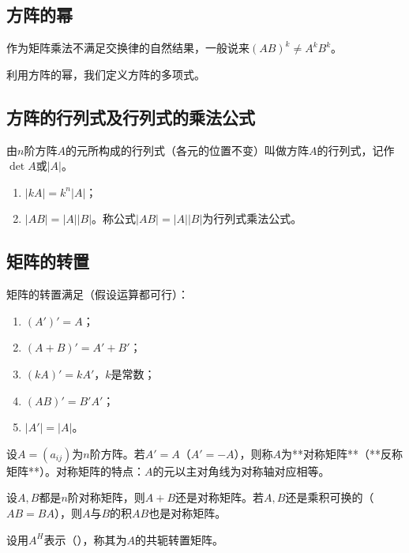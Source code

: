 \subsection{方阵的幂}
作为矩阵乘法不满足交换律的自然结果，一般说来$(AB)^k\neq A^kB^k$。

利用方阵的幂，我们定义方阵的多项式。

\subsection{方阵的行列式及行列式的乘法公式}
\begin{definition}
由$n$阶方阵$A$的元所构成的行列式（各元的位置不变）叫做方阵$A$的行列式，记作$\det A$或$|A|$。
\end{definition}

\begin{theorem}
\begin{enumerate}
    \item $|kA|=k^n|A|$；
    \item $|AB| =|A| |B|$。称公式$|AB| =|A| |B|$为行列式乘法公式。
\end{enumerate}
\end{theorem}

\subsection{矩阵的转置}
\begin{definition}
\end{definition}

矩阵的转置满足（假设运算都可行）：
\begin{enumerate}
    \item $(A')'=A$；
    \item $(A+B)'=A'+B'$；
    \item $(kA)'=kA'$，$k$是常数；
    \item $(AB)'=B'A'$；
    \item $|A'|=|A|$。
\end{enumerate}

设$A=(a_{ij})$为$n$阶方阵。若$A'=A$（$A'=-A$），则称$A$为**对称矩阵**（**反称矩阵**）。对称矩阵的特点：$A$的元以主对角线为对称轴对应相等。

设$A,B$都是$n$阶对称矩阵，则$A+B$还是对称矩阵。若$A,B$还是乘积可换的（$AB=BA$），则$A$与$B$的积$AB$也是对称矩阵。

\begin{definition}
设用$A^H$表示（），称其为$A$的共轭转置矩阵。
\end{definition}

